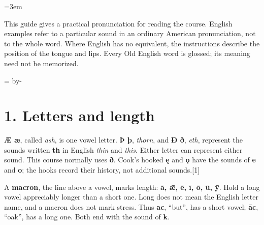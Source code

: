 \newcommand{\runningtitle}{Pronunciation}

\emergencystretch=3em
\newcommand{\reserve}[1]{\par\penalty-100\begingroup\dimen0=\pagegoal\advance\dimen0 by-\pagetotal\ifdim\dimen0<#1\newpage\fi\endgroup}
\newcommand{\itempara}[2]{\par\addvspace{3pt}\begingroup\raggedright\noindent\hangindent=1.8em\hangafter=1\makebox[1.8em][l]{#1.}#2\par\endgroup}

\raggedright
{}

This guide gives a practical pronunciation for reading the course. English examples refer to a particular sound in an ordinary American pronunciation, not to the whole word. Where English has no equivalent, the instructions describe the position of the tongue and lips. Every Old English word is glossed; its meaning need not be memorized.

\reserve{4\baselineskip}
\section*{1. Letters and length}

\textbf{Æ æ}, called \emph{ash}, is one vowel letter. \textbf{Þ þ}, \emph{thorn}, and \textbf{Ð ð}, \emph{eth}, represent the sounds written \textbf{th} in English \emph{thin} and \emph{this}. Either letter can represent either sound. This course normally uses \textbf{ð}. Cook's hooked \textbf{ę} and \textbf{ǫ} have the sounds of \textbf{e} and \textbf{o}; the hooks record their history, not additional sounds.[1]

A \textbf{macron}, the line above a vowel, marks length: \textbf{ā, ǣ, ē, ī, ō, ū, ȳ}. Hold a long vowel appreciably longer than a short one. Long does not mean the English letter name, and a macron does not mark stress. Thus \textbf{ac}, “but”, has a short vowel; \textbf{āc}, “oak”, has a long one. Both end with the sound of \textbf{k}.

